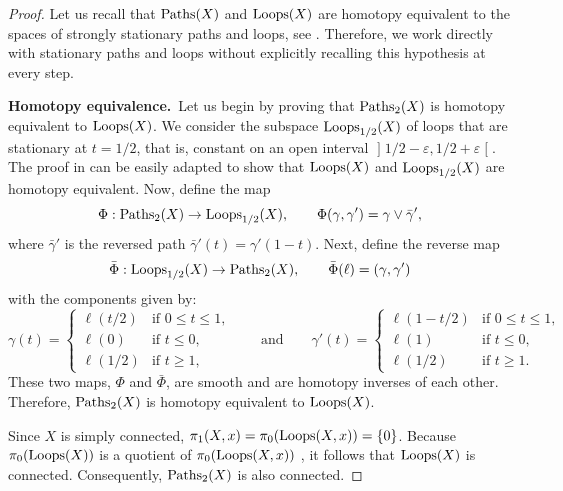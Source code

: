 \documentclass[10pt,reqno,letterpaper,twoside]{amsbook}
\begin{document}
  \begin{proof}
    Let us recall that $\operatorname{Paths}(X)$ and $\operatorname{Loops}(X)$ are homotopy equivalent to the spaces of strongly stationary paths and loops,
    see \cite[]{PIZ13}.
    Therefore,
    we work directly with stationary paths and loops without explicitly recalling this hypothesis at every step.
    
    \textbf{Homotopy equivalence.}~Let us begin by proving that $\operatorname{Paths}_2(X)$ is homotopy equivalent to $\operatorname{Loops}(X)$.
    We consider the subspace $\operatorname{Loops}_{1/2}(X)$ of loops that are stationary at $t = 1/2$,
    that is,
    constant on an open interval $\mathopen]1/2 -\varepsilon, 1/2+\varepsilon\mathclose[$.
    The proof in \cite[Ex. 84]{PIZ13} can be easily adapted to show that $\operatorname{Loops}(X)$ and $\operatorname{Loops}_{1/2}(X)$ are homotopy equivalent.
    Now,
    define the map
    \[
      \Phi: \operatorname{Paths}_2(X) \to \operatorname{Loops}_{1/2}(X),
      \qquad
      \Phi(\gamma,\gamma') = \gamma \vee \bar\gamma',
      \]
    where $\bar\gamma'$ is the reversed path $\bar\gamma'(t) = \gamma'(1-t)$.
    Next,
    define the reverse map
    \[
      \bar\Phi : \operatorname{Loops}_{1/2}(X) \to \operatorname{Paths}_2(X),
      \qquad
      \bar\Phi(\ell) = (\gamma,\gamma')
      \]
    with the components given by:
    \[
      \gamma(t) =
      \begin{cases}
      \ell(t/2) & \text{if } 0 \leq t \leq 1, \\
      \ell(0)   & \text{if } t \leq 0, \\
      \ell(1/2) & \text{if } t \geq 1,
      \end{cases}
      \qquad\text{and}\qquad
      \gamma'(t) =
      \begin{cases}
      \ell(1-t/2) & \text{if } 0 \leq t \leq 1, \\
      \ell(1)     & \text{if } t \leq 0, \\
      \ell(1/2)   & \text{if } t \geq 1.
      \end{cases}
      \]
    These two maps,
    $\Phi$ and $\bar\Phi$,
    are smooth and are homotopy inverses of each other.
    Therefore,
    $\operatorname{Paths}_2(X)$ is homotopy equivalent to $\operatorname{Loops}(X)$.
    
    Since $X$ is simply connected,
    $\pi_1(X,x) = \pi_0(\operatorname{Loops}(X,x)) = \{0\}$.
    Because $\pi_0(\operatorname{Loops}(X))$ is a quotient of $\pi_0(\operatorname{Loops}(X,x))$ \cite[Ex. 87]{PIZ13},
    it follows that $\operatorname{Loops}(X)$ is connected.
    Consequently,
    $\operatorname{Paths}_2(X)$ is also connected.
    

\end{proof}
\end{document}
